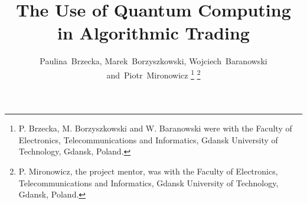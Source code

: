 


%
\title{The Use of Quantum Computing\\ in Algorithmic Trading}
%
%
%
\author{Paulina~Brzecka,
        Marek~Borzyszkowski,
        Wojciech~Baranowski
        and~Piotr~Mironowicz%
\thanks{P. Brzecka, M. Borzyszkowski and W. Baranowski were with the Faculty 
of Electronics, Telecommunications and Informatics, Gdansk University of Technology, Gdansk,
Poland.}%
\thanks{P. Mironowicz, the project mentor, was with the Faculty 
of Electronics, Telecommunications and Informatics, Gdansk University of Technology, Gdansk,
Poland.}
}
% 
%



